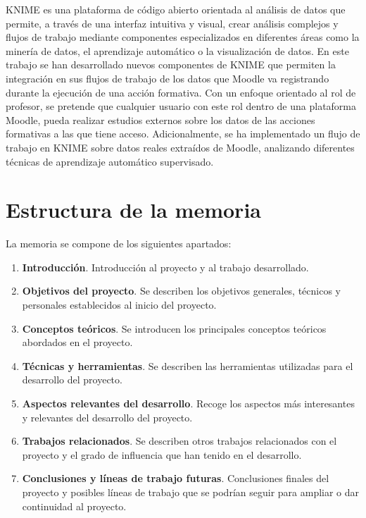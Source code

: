 KNIME es una plataforma de código abierto orientada al análisis de datos que permite, a través de una interfaz intuitiva y visual, 
crear análisis complejos y flujos de trabajo mediante componentes especializados en diferentes áreas como la minería de datos, 
el aprendizaje automático o la visualización de datos. En este trabajo se han desarrollado nuevos componentes de KNIME que permiten la 
integración en sus flujos de trabajo de los datos que Moodle va registrando durante la ejecución de una acción formativa. 
Con un enfoque orientado al rol de profesor, se pretende que cualquier usuario con este rol dentro de una 
plataforma Moodle, pueda realizar estudios externos sobre los datos de las acciones formativas a las que tiene acceso. 
Adicionalmente, se ha implementado un flujo de trabajo en KNIME sobre datos reales extraídos de Moodle, analizando diferentes 
técnicas de aprendizaje automático supervisado. 
\


\section{Estructura de la memoria}

La memoria se compone de los siguientes apartados: 
\

\begin{enumerate}
	\item \textbf{Introducción}. Introducción al proyecto y al trabajo desarrollado. 
	\item \textbf{Objetivos del proyecto}. Se describen los objetivos generales, técnicos y personales establecidos al inicio del proyecto.
	\item \textbf{Conceptos teóricos}. Se introducen los principales conceptos teóricos abordados en el proyecto. 
	\item \textbf{Técnicas y herramientas}. Se describen las herramientas utilizadas para el desarrollo del proyecto.
	\item \textbf{Aspectos relevantes del desarrollo}. Recoge los aspectos más interesantes y relevantes del desarrollo del proyecto.
	\item \textbf{Trabajos relacionados}. Se describen otros trabajos relacionados con el proyecto y el grado de influencia que han tenido en el desarrollo.
	\item \textbf{Conclusiones y líneas de trabajo futuras}. Conclusiones finales del proyecto y posibles líneas de trabajo que se podrían seguir para ampliar o dar continuidad al proyecto. 
\end{enumerate}


